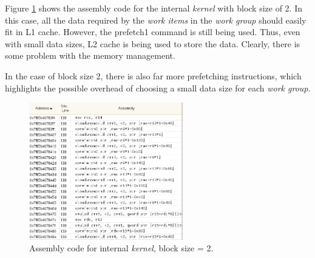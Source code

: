 \par{Figure \ref{Assembly_2} shows the assembly code for the internal \emph{kernel} with 
    block size of 2. In this case, all the data required by the \emph{work items} in 
    the \emph{work group} should easily fit in L1 cache. However, the prefetch1 
    command is still being used. Thus, even with small data sizes, L2 cache 
    is being used to store the data. Clearly, there is some problem with 
    the memory management.}

\par{In the case of block size 2, there is also far more prefetching 
    instructions, which highlights the possible overhead of choosing 
    a small data size for each \emph{work group}.}

\begin{figure}[!h]
    \centering
    \includegraphics[width=0.6\textwidth]{figures/Assembly_2.png}
    \caption{Assembly code for internal \emph{kernel}, block size = 2.}
    \label{Assembly_2}
\end{figure}


